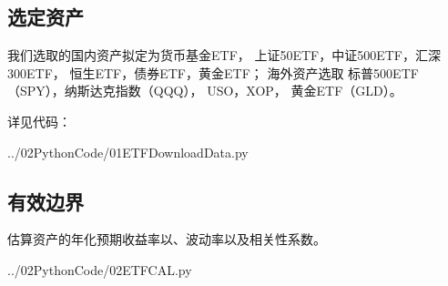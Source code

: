 \documentclass[a4paper, 11pt, UTF8]{report}
\begin{document}
\subsection{选定资产}

我们选取的国内资产拟定为货币基金ETF，
上证50ETF，中证500ETF，汇深300ETF，
恒生ETF，债券ETF，黄金ETF；
海外资产选取
标普500ETF（SPY），纳斯达克指数（QQQ），
USO，XOP，
黄金ETF（GLD）。

详见代码：


                {../02PythonCode/01ETFDownloadData.py}


\newpage
\subsection{有效边界}

估算资产的年化预期收益率以、波动率以及相关性系数。


                {../02PythonCode/02ETFCAL.py}
\end{document}
